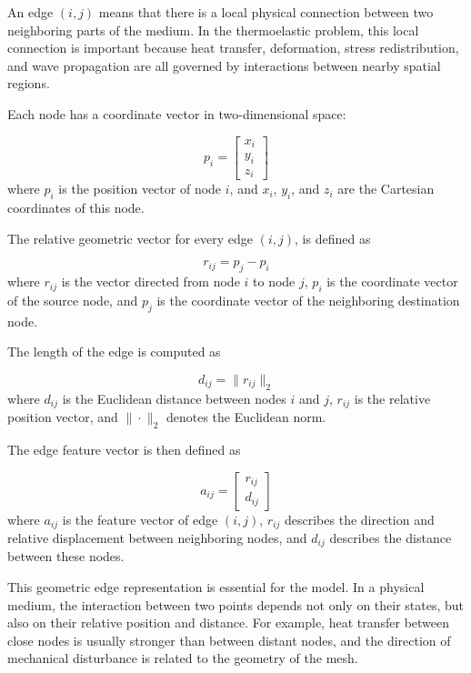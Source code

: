 An edge \((i,j)\) means that there is a local physical connection between two neighboring parts of the medium. In the thermoelastic problem, this local connection is important because heat transfer, deformation, stress redistribution, and wave propagation are all governed by interactions between nearby spatial regions.

Each node has a coordinate vector in two-dimensional space:

\begin{equation}
p_i =
\begin{bmatrix}
x_i \\
y_i \\
z_i
\end{bmatrix}
\end{equation}
where \(p_i\) is the position vector of node \(i\), and \(x_i\), \(y_i\), and \(z_i\) are the Cartesian coordinates of this node.

The relative geometric vector for every edge \((i,j)\), is defined as

\begin{equation}
r_{ij} = p_j - p_i
\end{equation}
where \(r_{ij}\) is the vector directed from node \(i\) to node \(j\), \(p_i\) is the coordinate vector of the source node, and \(p_j\) is the coordinate vector of the neighboring destination node.

The length of the edge is computed as

\begin{equation}
d_{ij} = \|r_{ij}\|_2
\end{equation}
where \(d_{ij}\) is the Euclidean distance between nodes \(i\) and \(j\), \(r_{ij}\) is the relative position vector, and \(\|\cdot\|_2\) denotes the Euclidean norm.

The edge feature vector is then defined as

\begin{equation}
a_{ij}
=
\begin{bmatrix}
r_{ij} \\
d_{ij}
\end{bmatrix}
\end{equation}
where \(a_{ij}\) is the feature vector of edge \((i,j)\), \(r_{ij}\) describes the direction and relative displacement between neighboring nodes, and \(d_{ij}\) describes the distance between these nodes.

This geometric edge representation is essential for the model. In a physical medium, the interaction between two points depends not only on their states, but also on their relative position and distance. For example, heat transfer between close nodes is usually stronger than between distant nodes, and the direction of mechanical disturbance is related to the geometry of the mesh.

